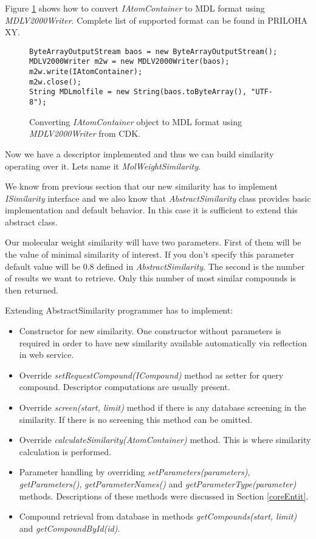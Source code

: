 \documentclass[thesis=M,english]{FITthesis}[2012/10/20]
\begin{document}
Figure \ref{ConvertAtomToMDL} shows how to convert \textit{IAtomContainer} to MDL format using \textit{MDLV2000Writer}. Complete list of supported format can be found in PRILOHA XY.

\begin{figure}
\begin{lstlisting}
ByteArrayOutputStream baos = new ByteArrayOutputStream();
MDLV2000Writer m2w = new MDLV2000Writer(baos);
m2w.write(IAtomContainer);
m2w.close();
String MDLmolfile = new String(baos.toByteArray(), "UTF-8");
\end{lstlisting}
\caption{Converting \textit{IAtomContainer} object to MDL format using \textit{MDLV2000Writer} from CDK.}
\label{ConvertAtomToMDL}
\end{figure}

Now we have a descriptor implemented and thus we can build similarity operating over it. Lets name it \textit{MolWeightSimilarity}.

We know from previous section that our new similarity has to implement \textit{ISimilarity} interface and we also know that \textit{AbstractSimilarity} class provides basic implementation and default behavior. In this case it is sufficient to extend this abstract class. 

Our molecular weight similarity will have two parameters. First of them will be the value of minimal similarity of interest. If you don’t specify this parameter default value will be 0.8 defined in \textit{AbstractSimilarity}. The second is the number of results we want to retrieve. Only this number of most similar compounds is then returned.

Extending AbstractSimilarity programmer has to implement:
\begin{itemize}
\item Constructor for new similarity. One constructor without parameters is required in order to have new similarity available automatically via reflection in web service. 
\item Override \textit{setRequestCompound(ICompound)} method as setter for query compound. Descriptor computations are usually present.
\item Override \textit{screen(start, limit)} method if there is any database screening in the similarity. If there is no screening this method can be omitted.
\item Override \textit{calculateSimilarity(AtomContainer)} method. This is where similarity calculation is performed.
\item Parameter handling by overriding \textit{setParameters(parameters)}, \textit{getParameters()}, \textit{getParameterNames()} and \textit{getParameterType(parameter)} methods. Descriptions of these methods were discussed in Section \ref{coreEntit}.
\item Compound retrieval from database in methods \textit{getCompounds(start, limit)} and   \textit{getCompoundById(id)}.
\end{itemize}
\end{document}
